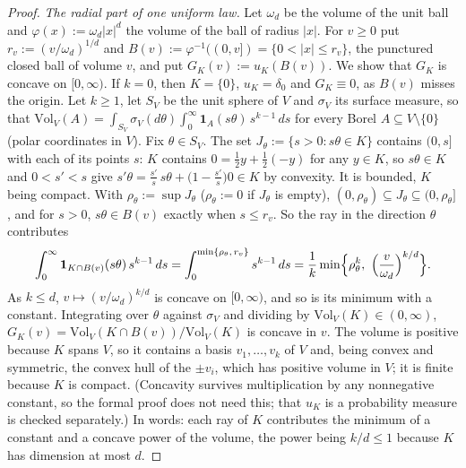 \begin{proof}
\emph{The radial part of one uniform law.} Let $\omega_d$ be the volume of the unit ball and
$\varphi(x) := \omega_d|x|^d$ the volume of the ball of radius $|x|$. For $v \ge 0$ put
$r_v := (v/\omega_d)^{1/d}$ and $B(v) := \varphi^{-1}((0,v]) = \{0 < |x| \le r_v\}$, the
punctured closed ball of volume $v$, and put $G_K(v) := u_K(B(v))$. We show that $G_K$ is concave
on $[0,\infty)$. If $k = 0$, then $K = \{0\}$, $u_K = \delta_0$ and $G_K \equiv 0$, as $B(v)$
misses the origin. Let $k \ge 1$, let $S_V$ be the unit sphere of $V$ and $\sigma_V$ its surface
measure, so that $\mathrm{Vol}_V(A) = \int_{S_V}\sigma_V(d\theta)\int_0^\infty
\mathbf{1}_A(s\theta)\,s^{k-1}\,ds$ for every Borel $A \subseteq V \setminus \{0\}$ (polar
coordinates in $V$). Fix $\theta \in S_V$. The set $J_\theta := \{s > 0 : s\theta \in K\}$ contains
$(0, s]$ with each of its points $s$: $K$ contains $0 = \tfrac12 y + \tfrac12(-y)$ for any
$y \in K$, so $s\theta \in K$ and $0 < s' < s$ give
$s'\theta = \tfrac{s'}{s}\,s\theta + \bigl(1 - \tfrac{s'}{s}\bigr)0 \in K$ by convexity. It is
bounded, $K$ being compact. With $\rho_\theta := \sup J_\theta$ ($\rho_\theta := 0$ if
$J_\theta$ is empty), $(0,\rho_\theta) \subseteq J_\theta \subseteq (0,\rho_\theta]$, and for
$s > 0$, $s\theta \in B(v)$ exactly when $s \le r_v$. So the ray in the direction $\theta$
contributes
\[
  \int_0^\infty\mathbf{1}_{K \cap B(v)}(s\theta)\,s^{k-1}\,ds
   = \int_0^{\min\{\rho_\theta,\,r_v\}}s^{k-1}\,ds
   = \frac1k\min\Bigl\{\rho_\theta^k,\ \Bigl(\frac{v}{\omega_d}\Bigr)^{k/d}\Bigr\} .
\]
As $k \le d$, $v \mapsto (v/\omega_d)^{k/d}$ is concave on $[0,\infty)$, and so is its minimum with
a constant. Integrating over $\theta$ against $\sigma_V$ and dividing by
$\mathrm{Vol}_V(K) \in (0,\infty)$, $G_K(v) = \mathrm{Vol}_V(K \cap B(v))/\mathrm{Vol}_V(K)$ is
concave in $v$. The volume is positive because $K$ spans $V$, so it contains a basis
$v_1,\dots,v_k$ of $V$ and, being convex and symmetric, the convex hull of the $\pm v_i$, which has
positive volume in $V$; it is finite because $K$ is compact. (Concavity survives multiplication by
any nonnegative constant, so the formal proof does not need this; that $u_K$ is a probability
measure is checked separately.) In words: each ray of $K$ contributes the minimum of a constant and
a concave power of the volume, the power being $k/d \le 1$ because $K$ has dimension at most $d$.


\end{proof}
